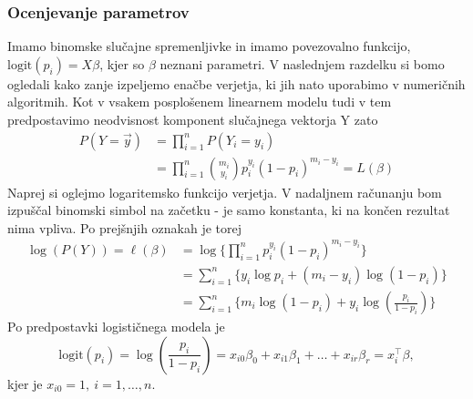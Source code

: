 \documentclass[12pt,a4paper]{amsart}
\theoremstyle{definition} %
\theoremstyle{plain} %
\begin{document}
\subsubsection{Ocenjevanje parametrov}\label{ocenpar_logit}
Imamo binomske slučajne spremenljivke in imamo povezovalno funkcijo, $\mathrm{logit}(p_{i}) = X\beta$, kjer so $\beta$ neznani parametri.
V naslednjem razdelku si bomo ogledali kako zanje izpeljemo enačbe verjetja, ki jih nato uporabimo v numeričnih algoritmih.
Kot v vsakem posplošenem linearnem modelu tudi v tem predpostavimo neodvisnost komponent slučajnega vektorja $\mathrm{Y}$ zato 
\begin{align*}
    P(Y = \vec{y}) &= \prod_{i=1}^{n} P(Y_{i} = y_{i}) \\
                    &=\prod_{i=1}^{n} {m_{i} \choose y_{i}} p_{i}^{y_{i}}(1 - p_{i})^{m_{i} - y_{i}} = L(\beta)
\end{align*}
Naprej si oglejmo logaritemsko funkcijo verjetja. V nadaljnem računanju bom izpuščal binomski simbol na začetku - je samo konstanta, ki na
končen rezultat nima vpliva. Po prejšnjih oznakah je torej
\begin{align}\label{logit1}
    \log (P(Y)) = \ell(\beta) &= \log\{\prod_{i=1}^{n} p_{i}^{y_{i}}(1 - p_{i})^{m_{i} - y_{i}} \} \nonumber  \\
        &= \sum_{i=1}^{n}\{y_{i}\log{p_{i}} + (m_{i} - y_{i})\log(1 - p_{i})\} \nonumber \\
        &= \sum_{i=1}^{n}\{m_{i}\log{(1-p_{i})}  + y_{i}\log{\left(\frac{p_{i}}{1-p_{i}}\right)}\}
\end{align}
Po predpostavki logističnega modela je
\[
   \mathrm{logit}(p_{i}) = \log\left( \frac{p_{i}}{1-p_{i}}  \right) = x_{i0}\beta_{0} + x_{i1}\beta_{1} + \ldots + x_{ir}\beta_{r} = x_{i}^\top \beta,
\]
kjer je $x_{i0}=1,~i=1,\ldots,n.$
\end{document}
